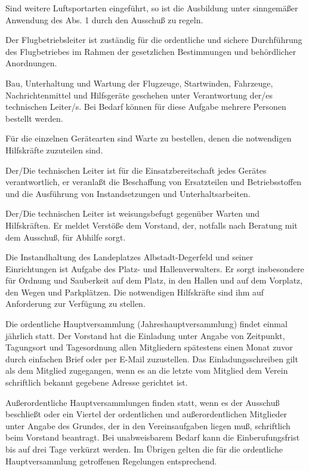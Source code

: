 \documentclass[10pt,a4paper,parskip=half]{scrartcl}
\begin{document}
\begin{contract}
\begin{multicols}{2}
\begin{enumerate}[label=\alph*),noitemsep]
\begin{enumerate}[label=\alph*),noitemsep]
    Sind weitere Luftsportarten eingeführt,
    so ist die Ausbildung unter sinngemäßer Anwendung des Abs. 1 durch den Ausschuß zu regeln.
    
    Der Flugbetriebsleiter ist zuständig für die ordentliche und sichere Durchführung des Flugbetriebes im Rahmen der gesetzlichen Bestimmungen und behördlicher Anordnungen.
    
    Bau,
    Unterhaltung und Wartung der Flugzeuge,
    Startwinden,
    Fahrzeuge,
    Nachrichtenmittel und Hilfsgeräte geschehen unter Verantwortung der/es technischen Leiter/s.
    Bei Bedarf können für diese Aufgabe mehrere Personen bestellt werden.
    
    Für die einzelnen Gerätearten sind Warte zu bestellen,
    denen die notwendigen Hilfskräfte zuzuteilen sind.
    
    Der/Die technischen Leiter ist für die Einsatzbereitschaft jedes Gerätes verantwortlich,
    er veranlaßt die Beschaffung von Ersatzteilen und Betriebsstoffen und die Ausführung von Instandsetzungen und Unterhaltsarbeiten.
    
    Der/Die technischen Leiter ist weisungsbefugt gegenüber Warten und Hilfskräften.
    Er meldet Verstöße dem Vorstand,
    der,
    notfalls nach Beratung mit dem Ausschuß,
    für Abhilfe sorgt.
    
    Die Instandhaltung des Landeplatzes Albstadt-Degerfeld und seiner Einrichtungen ist Aufgabe des Platz- und Hallenverwalters.
    Er sorgt insbesondere für Ordnung und Sauberkeit auf dem Platz,
    in den Hallen und auf dem Vorplatz,
    den Wegen und Parkplätzen.
    Die notwendigen Hilfskräfte sind ihm auf Anforderung zur Verfügung zu stellen.
    
    \label{C:Hauptversammlung}
    Die ordentliche Hauptversammlung (Jahreshauptversammlung) findet einmal jährlich statt.
    Der Vorstand hat die Einladung unter Angabe von Zeitpunkt,
    Tagungsort und Tagesordnung allen Mitgliedern spätestens einen Monat zuvor durch einfachen Brief oder per E-Mail zuzustellen.
    Das Einladungsschreiben gilt als dem Mitglied zugegangen,
    wenn es an die letzte vom Mitglied dem Verein schriftlich bekannt gegebene Adresse gerichtet ist.
    
    Außerordentliche Hauptversammlungen finden statt,
    wenn es der Ausschuß beschließt oder ein Viertel der ordentlichen und außerordentlichen Mitglieder unter Angabe des Grundes,
    der in den Vereinsaufgaben liegen muß,
    schriftlich beim Vorstand beantragt.
    Bei unabweisbarem Bedarf kann die Einberufungsfrist bis auf drei Tage verkürzt werden.
    Im Übrigen gelten die für die ordentliche Hauptversammlung getroffenen Regelungen entsprechend.
    

\end{enumerate}
\end{enumerate}
\end{multicols}
\end{contract}
\end{document}
